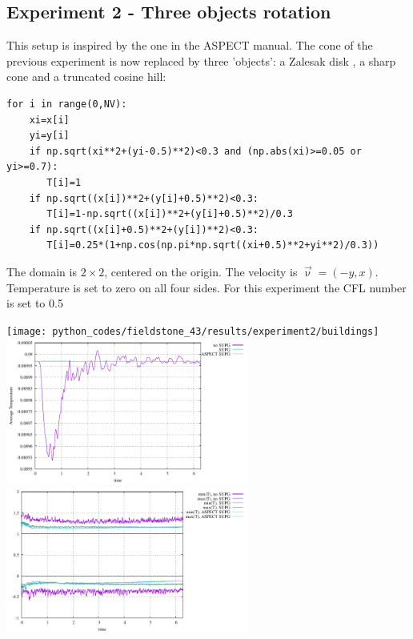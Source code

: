 \subsection*{Experiment 2 - Three objects rotation}

This setup is inspired by the one in the ASPECT manual. The cone of the previous 
experiment is now replaced by three 'objects': a Zalesak disk \cite{zale79}, 
a sharp cone and a truncated cosine hill:

\begin{lstlisting}
for i in range(0,NV):
    xi=x[i]
    yi=y[i]
    if np.sqrt(xi**2+(yi-0.5)**2)<0.3 and (np.abs(xi)>=0.05 or yi>=0.7):
       T[i]=1
    if np.sqrt((x[i])**2+(y[i]+0.5)**2)<0.3:
       T[i]=1-np.sqrt((x[i])**2+(y[i]+0.5)**2)/0.3
    if np.sqrt((x[i]+0.5)**2+(y[i])**2)<0.3:
       T[i]=0.25*(1+np.cos(np.pi*np.sqrt((xi+0.5)**2+yi**2)/0.3))
\end{lstlisting}

The domain is $2\times2$, centered on the origin. The velocity is $\vec\upnu=(-y,x)$. Temperature 
is set to zero on all four sides. For this experiment the CFL number is set to 0.5

\begin{center}
\texttt{[image: python\_codes/fieldstone\_43/results/experiment2/buildings]}\\
\includegraphics[width=8cm]{python_codes/fieldstone_43/results/experiment2/avrg_T}
\includegraphics[width=8cm]{python_codes/fieldstone_43/results/experiment2/stats_T}
\end{center}

